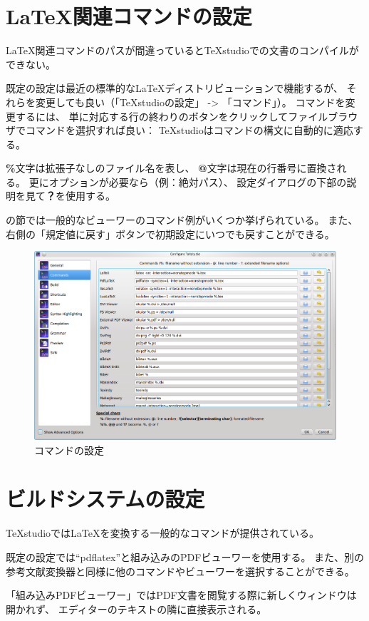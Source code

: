 \section{LaTeX関連コマンドの設定}

LaTeX関連コマンドのパスが間違っているとTeXstudioでの文書のコンパイルができない。

既定の設定は最近の標準的なLaTeXディストリビューションで機能するが、
それらを変更しても良い（「TeXstudioの設定」 -\textgreater{} 「コマンド」）。
コマンドを変更するには、
単に対応する行の終わりのボタンをクリックしてファイルブラウザでコマンドを選択すれば良い：
TeXstudioはコマンドの構文に自動的に適応する。

\textbf{\%}文字は拡張子なしのファイル名を表し、
\textbf{@}文字は現在の行番号に置換される。
更にオプションが必要なら（例：絶対パス）、
設定ダイアログの下部の説明を見て\textbf{？}を使用する。

の節では一般的なビューワーのコマンド例がいくつか挙げられている。
また、右側の「規定値に戻す」ボタンで初期設定にいつでも戻すことができる。

\begin{figure}[H]
  \centering
  \includegraphics[width=.8\linewidth]{configure_commands.png}
  \caption{コマンドの設定}
\end{figure}

\section{ビルドシステムの設定}

TeXstudioではLaTeXを変換する一般的なコマンドが提供されている。

既定の設定では``pdflatex''と組み込みのPDFビューワーを使用する。
また、別の参考文献変換器と同様に他のコマンドやビューワーを選択することができる。

「組み込みPDFビューワー」ではPDF文書を閲覧する際に新しくウィンドウは開かれず、
エディターのテキストの隣に直接表示される。

